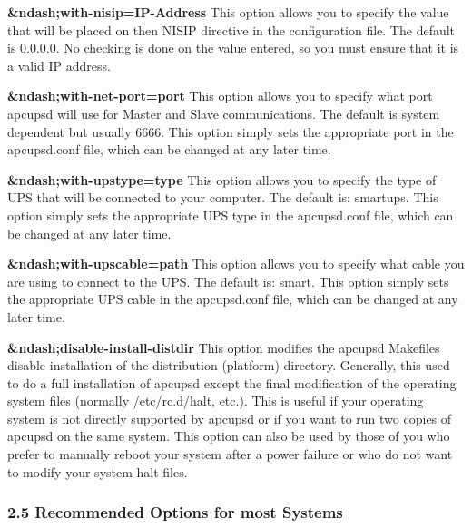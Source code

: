 \begin{description}
\item {\bf \&ndash;with-nisip=\lt{}IP-Address\gt{}}
This option allows you to specify the value that will be placed on then NISIP
directive in the configuration file. The default is 0.0.0.0. No checking is
done on the value entered, so you must ensure that it is a valid IP address.  

\item {\bf \&ndash;with-net-port=\lt{}port\gt{}}
This option allows you to specify what port apcupsd will use for Master and
Slave communications. The default is system dependent but usually 6666. This
option simply sets the appropriate port in the apcupsd.conf file, which can be
changed at any later time.  

\item {\bf \&ndash;with-upstype=\lt{}type\gt{}}
This option allows you to specify the type of UPS that will be connected to
your computer. The default is: smartups. This option simply sets the
appropriate UPS type in the apcupsd.conf file, which can be changed at any
later time.  

\item {\bf \&ndash;with-upscable=\lt{}path\gt{}}
This option allows you to specify what cable you are using to connect to the
UPS. The default is: smart. This option simply sets the appropriate UPS cable
in the apcupsd.conf file, which can be changed at any later time.  

\item {\bf \&ndash;disable-install-distdir}
This option modifies the apcupsd Makefiles disable installation of the
distribution (platform) directory. Generally, this used to do a full
installation of apcupsd except the final modification of the operating system
files (normally /etc/rc.d/halt, etc.). This is useful if your operating system
is not directly supported by apcupsd or if you want to run two copies of
apcupsd on the same system. This option can also be used by those of you who
prefer to manually reboot your system after a power failure or who do not want
to modify your system halt files. 
\end{description}

\label{Recommended-Options-for-most-Systems}

\subsubsection*{2.5 Recommended Options for most Systems}

